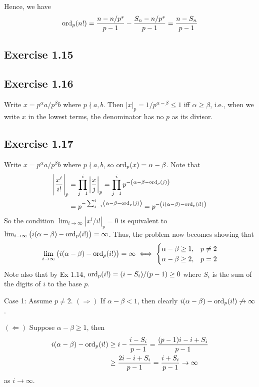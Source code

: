 \documentclass[../Koblitz.tex]{subfiles}
\begin{document}
Hence, we have
\begin{align*}
\operatorname{ord}_p(n!) = \frac{n-n/p^s}{p-1} - \frac{S_n - n/p^s}{p-1} = \frac{n-S_n}{p-1}
\end{align*}

\subsection*{Exercise 1.15}

\subsection*{Exercise 1.16}

Write $x=p^\alpha a/p^\beta b$ where $p\nmid a,b$. Then $|x|_p=1/p^{\alpha-\beta}\leq1$ iff $\alpha\geq\beta$, i.e., when we write $x$ in the lowest terms, the denominator has no $p$ as its divisor.

\subsection*{Exercise 1.17}

Write $x=p^\alpha a/p^\beta b$ where $p\nmid a,b$, so $\operatorname{ord}_p(x)=\alpha-\beta$. Note that
\begin{align*}
\left|\frac{x^i}{i!}\right|_p &= \prod_{j=1}^i \left|\frac{x}{j}\right|_p = \prod_{j=1}^i p^{-\left(\alpha-\beta-\operatorname{ord}_p(j)\right)} \\
&= p^{-\sum_{j=1}^i \left(\alpha-\beta-\operatorname{ord}_p(j)\right)} = p^{-\left(i(\alpha-\beta)-\operatorname{ord}_p(i!)\right)}
\end{align*}
So the condition $\lim_{i\to\infty} |x^i/i!|_p=0$ is equivalent to $\lim_{i\to\infty} \left(i(\alpha-\beta)-\operatorname{ord}_p(i!)\right)=\infty$. Thus, the problem now becomes showing that
\begin{align*}
\lim_{i\to\infty} \left(i(\alpha-\beta)-\operatorname{ord}_p(i!)\right)=\infty \iff
\begin{cases}
\alpha-\beta\geq 1, &p\neq2 \\
\alpha-\beta\geq 2, &p=2
\end{cases}
\end{align*}
Note also that by Ex 1.14, $\operatorname{ord}_p(i!)=(i-S_i)/(p-1)\geq0$ where $S_i$ is the sum of the digits of $i$ to the base $p$.

Case 1: Assume $p\neq2$. $(\Rightarrow)$ If $\alpha-\beta<1$, then clearly $i(\alpha-\beta)-\operatorname{ord}_p(i!)\not\to\infty$.

$(\Leftarrow)$ Suppose $\alpha-\beta\geq 1$, then
\begin{align*}
i(\alpha-\beta)-\operatorname{ord}_p(i!) &\geq i-\frac{i-S_i}{p-1} = \frac{(p-1)i-i+S_i}{p-1} \\
&\geq \frac{2i-i+S_i}{p-1} = \frac{i+S_i}{p-1} \to \infty
\end{align*}
as $i\to\infty$.
\end{document}
